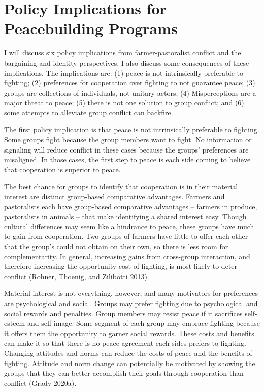 \documentclass[11pt]{article}
\begin{document}
\hypertarget{policy-implications-for-peacebuilding-programs}{%
\section{Policy Implications for Peacebuilding
Programs}\label{policy-implications-for-peacebuilding-programs}}

I will discuss six policy implications from farmer-pastoralist conflict
and the bargaining and identity perspectives. I also discuss some
consequences of these implications. The implications are: (1) peace is
not intrinsically preferable to fighting; (2) preferences for
cooperation over fighting to not guarantee peace; (3) groups are
collections of individuals, not unitary actors; (4) Misperceptions are a
major threat to peace; (5) there is not one solution to group conflict;
and (6) some attempts to alleviate group conflict can backfire.

The first policy implication is that peace is not intrinsically
preferable to fighting. Some groups fight because the group members want
to fight. No information or signaling will reduce conflict in these
cases because the groups' preferences are misaligned. In those cases,
the first step to peace is each side coming to believe that cooperation
is superior to peace.

The best chance for groups to identify that cooperation is in their
material interest are distinct group-based comparative advantages.
Farmers and pastoralists each have group-based comparative advantages --
farmers in produce, pastoralists in animals -- that make identifying a
shared interest easy. Though cultural differences may seem like a
hindrance to peace, these groups have much to gain from cooperation. Two
groups of farmers have little to offer each other that the group's could
not obtain on their own, so there is less room for complementarity. In
general, increasing gains from cross-group interaction, and therefore
increasing the opportunity cost of fighting, is most likely to deter
conflict (Rohner, Thoenig, and Zilibotti 2013).

Material interest is not everything, however, and many motivators for
preferences are psychological and social. Groups may prefer fighting due
to psychological and social rewards and penalties. Group members may
resist peace if it sacrifices self-esteem and self-image. Some segment
of each group may embrace fighting because it offers them the
opportunity to garner social rewards. These costs and benefits can make
it so that there is no peace agreement each sides prefers to fighting.
Changing attitudes and norms can reduce the costs of peace and the
benefits of fighting. Attitude and norm change can potentially be
motivated by showing the groups that they can better accomplish their
goals through cooperation than conflict (Grady 2020a).
\end{document}
